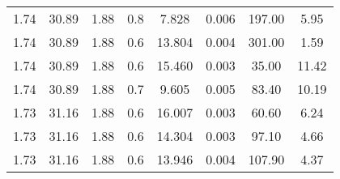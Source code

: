 \begin{table}[H]
\begin{tabular}{S S S S S S S S }
1.74  & 30.89  & 1.88  & 0.8  & 7.828  & 0.006  & 197.00  & 5.95\\ 
1.74  & 30.89  & 1.88  & 0.6  & 13.804  & 0.004  & 301.00  & 1.59\\ 
1.74  & 30.89  & 1.88  & 0.6  & 15.460  & 0.003  & 35.00  & 11.42\\ 
1.74  & 30.89  & 1.88  & 0.7  & 9.605  & 0.005  & 83.40  & 10.19\\ 
1.73  & 31.16  & 1.88  & 0.6  & 16.007  & 0.003  & 60.60  & 6.24\\ 
1.73  & 31.16  & 1.88  & 0.6  & 14.304  & 0.003  & 97.10  & 4.66\\ 
1.73  & 31.16  & 1.88  & 0.6  & 13.946  & 0.004  & 107.90  & 4.37\\ 
\bottomrule 
\end{tabular} 
\end{table}